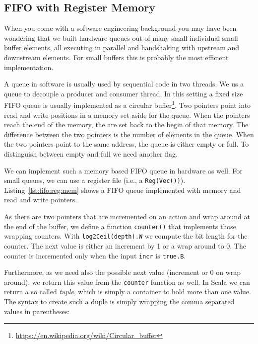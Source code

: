 \documentclass[%
    10pt,
    headinclude, footexclude,
    openright, %
    notitlepage,
    cleardoubleempty,
    headsepline,
    pointlessnumbers,
    bibtotoc, idxtotoc,
    ]{scrbook}
\newcommand{\code}[1]{{\small{\texttt{#1}}}}
\newcommand{\myref}[2]{\href{#1}{#2}}
\renewcommand{\myref}[2]{{#2}{\footnote{\url{#1}}}}
\begin{document}
\subsection{FIFO with Register Memory}

When you come with a software engineering background you may have been
wondering that we built hardware queues out of many small individual small buffer
elements, all executing in parallel and handshaking with upstream and downstream
elements. For small buffers this is probably the most efficient implementation.

A queue in software is usually used by sequential code in two threads.
We us a queue to decouple a producer and consumer thread.
In this setting a fixed size FIFO queue is usually implemented as a
\myref{https://en.wikipedia.org/wiki/Circular_buffer}{circular buffer}.
Two pointers point into read and write positions in a memory set aside
for the queue. When the pointers reach the end of the memory, the
are set back to the begin of that memory. The difference between the two
pointers is the number of elements in the queue. When the two pointers
point to the same address, the queue is either empty or full.
To distinguish between empty and full we need another flag.

We can implement such a memory based FIFO queue in hardware as
well. For small queues, we can use a register file (i.e., a \code{Reg(Vec())}).
Listing~\ref{lst:fifo:reg:mem} shows a FIFO queue implemented with  memory
and read and write pointers.

\newpage
{}

As there are two pointers that are incremented on an
action and wrap around at the end of the buffer, we define a function \code{counter()}
that implements those wrapping counters. With \code{log2Ceil(depth).W} we
compute the bit length for the counter. The next value is either an increment by
1 or a wrap around to 0.
The counter is incremented only when the input \code{incr} is \code{true.B}.

Furthermore, as we need also the
possible next value (increment or 0 on wrap around), we return this value from
the \code{counter} function as well. In Scala we can return a so called \emph{tuple},
which is simply a container to hold more than one value. The syntax to create
such a duple is simply wrapping the comma separated values in parentheses:
\end{document}
